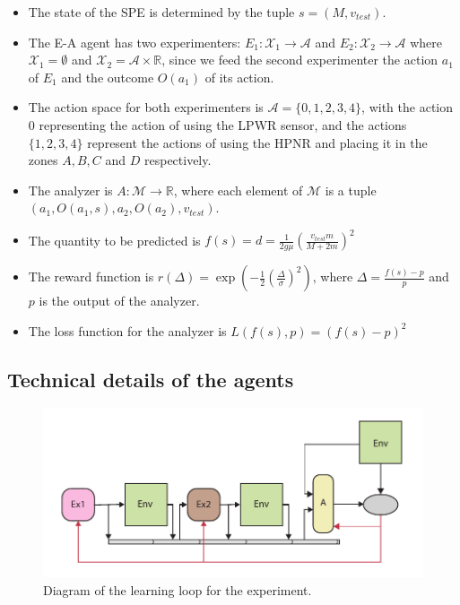 \documentclass[11pt,a4paper,twoside]{report}
\newcommand{\+}{\textnormal{+} }
\theoremstyle{definition}
\numberwithin{equation}{chapter}
\begin{document}
\begin{itemize}
  \item The state of the SPE is determined by the tuple $s=(M,v_{test})$.
  \item The E-A agent has two experimenters: $E_1:\mathcal{X}_1
  \rightarrow\mathcal{A}$ and $E_2:\mathcal{X}_2 \rightarrow\mathcal{A}$ where
  $\mathcal{X}_1=\emptyset$ and $\mathcal{X}_2=\mathcal{A}\times \mathbb{R}$,
  since we feed the second experimenter the action $a_1$ of $E_1$ and the
  outcome $O(a_1)$ of its action.
  \item The action space for both experimenters is $\mathcal{A}=\{0,1,2,3,4\}$, 
  with the action $0$ representing the action of using the LPWR sensor, and
  the actions $\{1,2,3,4\}$ represent the actions of using the HPNR and placing 
  it in the zones $A, B, C$ and $D$ respectively.
  \item The analyzer is $A:\mathcal{M}\rightarrow \mathbb{R}$, where each element
  of $\mathcal{M}$ is a tuple \\
  $\left(a_1,O(a_1,s),a_2,O(a_2),v_{test}\right)$.
  \item The quantity to be predicted is
  $f(s)=d=\frac{1}{2g\mu}\left(\frac{v_{test}m}{M+2m} \right)^2$
  \item The reward function is 
  $r(\Delta)=\exp\left(-\frac{1}{2}\left( \frac{\Delta}{\sigma} \right)
  ^2\right)$, where $\Delta = \frac{f(s)-p}{p}$ and $p$ is the output of the
  analyzer.
  \item The loss function for the analyzer is $L(f(s),p)=(f(s)-p)^2$
\end{itemize}

\subsection{Technical details of the agents}
\begin{figure}[H]
  \includegraphics[width=\columnwidth]{figures/Two-sensors.pdf}
  \caption{Diagram of the learning loop for the experiment.}
\end{figure}
\end{document}
